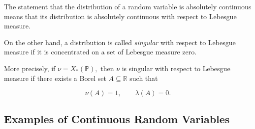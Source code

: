 \begin{remark}

The statement that the distribution of a random variable is absolutely
continuous means that its distribution is absolutely continuous with
respect to Lebesgue measure.

On the other hand, a distribution is called \emph{singular} with
respect to Lebesgue measure if it is concentrated on a set of Lebesgue
measure zero.

\end{remark}

More precisely, if
\(
\nu=X_*(\mathbb{P}),
\)
then $\nu$ is singular with respect to Lebesgue measure if there exists
a Borel set $A\subseteq\mathbb{R}$ such that

\[
\nu(A)=1,
\qquad
\lambda(A)=0.
\]

\subsection{Examples of Continuous Random Variables}

